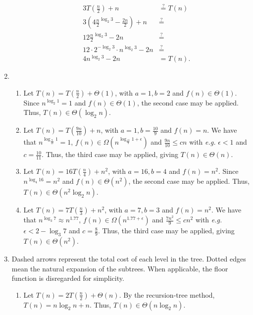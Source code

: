\documentclass[12pt]{article}
\begin{document}
\begin{enumerate}
\begin{enumerate}
        \begin{align*}
            3T(\tfrac{n}{2}) + n &\stackrel{?}{=} T(n) \\
            3(4\tfrac{n}{2}^{\log_{2} 3} - \tfrac{2n}{2}) + n &\stackrel{?}{=} \\
            12\tfrac{n}{2}^{\log_{2} 3} - 2n &\stackrel{?}{=} \\
            12 \cdot 2^{-\log_2 3} \cdot n^{\log_2 3} - 2n &\stackrel{?}{=} \\
            4n^{\log_{2} 3} - 2n &= T(n).
        \end{align*}
    \end{enumerate}
    \item
    \begin{enumerate}
        \item Let $T(n) = T(\frac{n}{2}) + \Theta(1)$, with $a = 1, b = 2$ and $f(n) \in \Theta(1)$. Since $n^{\log_{2} 1} = 1$ and $f(n) \in \Theta(1)$, the second case may be applied. Thus, $T(n) \in \Theta(\log_{2} n)$.
        \item Let $T(n) = T(\frac{9n}{10}) + n$, with $a = 1, b = \frac{10}{9}$ and $f(n) = n$. We have that $n^{\log_{\frac{9}{10}} 1} = 1$, $f(n) \in \Omega(n^{\log_{\frac{10}{9}} 1 + \epsilon})$ and $\frac{9n}{10} \leq cn$ with \emph{e.g.} $\epsilon < 1$ and $c = \frac{10}{11}$. Thus, the third case may be applied, giving $T(n) \in \Theta(n)$.
        \item Let $T(n) = 16T(\frac{n}{4}) + n^{2}$, with $a = 16, b = 4$ and $f(n) = n^{2}$. Since $n^{\log_{4} 16} = n^{2}$ and $f(n) \in \Theta(n^{2})$, the second case may be applied. Thus, $T(n) \in \Theta(n^{2} \log_{2} n)$.
        \item Let $T(n) = 7T(\frac{n}{3}) + n^{2}$, with $a = 7, b = 3$ and $f(n) = n^{2}$. We have that $n^{\log_{3} 7} \approx n^{1.77}$, $f(n) \in \Omega(n^{1.77 + \epsilon})$ and $\frac{7n^{2}}{9} \leq cn^{2}$ with \emph{e.g.} $\epsilon < 2 - \log_3 7$ and $c = \frac{8}{9}$. Thus, the third case may be applied, giving $T(n) \in \Theta(n^{2})$.
    \end{enumerate}
    \item Dashed arrows represent the total cost of each level in the tree. Dotted edges mean the natural expansion of the subtrees. When applicable, the floor function is disregarded for simplicity.
    \begin{enumerate}
        \item Let $T(n) = 2T(\frac{n}{2}) + \Theta(n)$. By the recursion-tree method, $T(n) = n \log_{2} n + n$. Thus, $T(n) \in \Theta(n \log_2 n)$.

\end{enumerate}
\end{enumerate}
\end{document}
